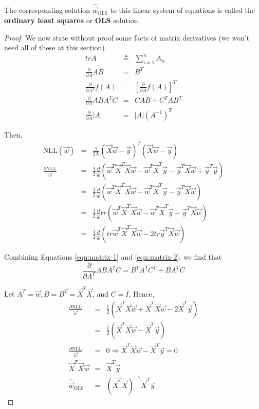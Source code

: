 \documentclass[8pt]{article}
\newlength{\norm}
\begin{document}
The corresponding solution $\hat{\vec{w}}_{\mathrm{OLS}}$ to this linear system of equations is called the \textbf{ordinary least squares} or \textbf{OLS} solution.

\begin{proof}
We now state without proof some facts of matrix derivatives (we won’t need all of these at this section).
\begin{eqnarray}
trA &\triangleq& \sum\limits_{i=1}^n A_{ii} \nonumber \\
\frac{\partial}{\partial A}AB &=& B^T \\
\frac{\partial}{\partial A^T}f(A) &=& \left[\frac{\partial}{\partial A}f(A)\right]^T \label{eqn:matrix-1} \\
\frac{\partial}{\partial A}ABA^TC &=& CAB+C^TAB^T \label{eqn:matrix-2} \\
\frac{\partial}{\partial A}|A| &=& |A|(A^{-1})^T
\end{eqnarray}

Then,
\begin{eqnarray*}
\text{NLL}(\vec{w}) &=& \frac{1}{2N}(\vec{X}\vec{w}-\vec{y})^T(\vec{X}\vec{w}-\vec{y}) \\
\frac{\partial \text{NLL}}{\vec{w}} &=& \frac{1}{2} \frac{\partial}{\vec{w}} (\vec{w}^T\vec{X}^T\vec{X}\vec{w}-\vec{w}^T\vec{X}^T\vec{y}-\vec{y}^T\vec{X}\vec{w}+\vec{y}^T\vec{y}) \\
                           &=& \frac{1}{2} \frac{\partial}{\vec{w}} (\vec{w}^T\vec{X}^T\vec{X}\vec{w}-\vec{w}^T\vec{X}^T\vec{y}-\vec{y}^T\vec{X}\vec{w}) \\
						   &=& \frac{1}{2} \frac{\partial}{\vec{w}} tr(\vec{w}^T\vec{X}^T\vec{X}\vec{w}-\vec{w}^T\vec{X}^T\vec{y}-\vec{y}^T\vec{X}\vec{w}) \\
						   &=& \frac{1}{2} \frac{\partial}{\vec{w}} (tr\vec{w}^T\vec{X}^T\vec{X}\vec{w}-2tr\vec{y}^T\vec{X}\vec{w})
\end{eqnarray*}

Combining Equations \ref{eqn:matrix-1} and \ref{eqn:matrix-2}, we find that 
\begin{equation*}
\frac{\partial}{\partial A^T}ABA^TC = B^TA^TC^T+BA^TC
\end{equation*}

Let $A^T=\vec{w}, B=B^T=\vec{X}^T\vec{X}$, and $C=I$, Hence,
\begin{eqnarray}
\frac{\partial \text{NLL}}{\vec{w}} &=& \frac{1}{2} (\vec{X}^T\vec{X}\vec{w}+\vec{X}^T\vec{X}\vec{w} -2\vec{X}^T\vec{y}) \nonumber \\
						   &=& \frac{1}{2} (\vec{X}^T\vec{X}\vec{w} - \vec{X}^T\vec{y}) \nonumber \\
\frac{\partial \text{NLL}}{\vec{w}} &=& 0 \Rightarrow \vec{X}^T\vec{X}\vec{w} - \vec{X}^T\vec{y} =0 \nonumber \\
\vec{X}^T\vec{X}\vec{w} &=& \vec{X}^T\vec{y} \label{eqn:normal-equation} \\
\hat{\vec{w}}_{\mathrm{OLS}} &=& (\vec{X}^T\vec{X})^{-1}\vec{X}^T\vec{y} \nonumber
\end{eqnarray}
\end{proof}
\end{document}
